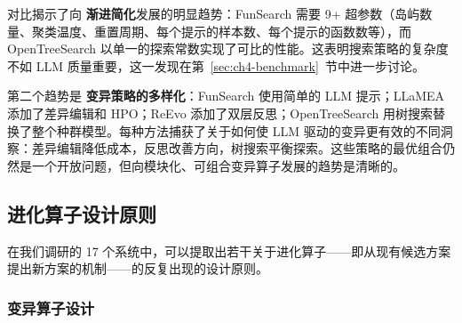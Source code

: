 \begin{table}[htbp]
\centering
{}
\caption{开源进化代码系统。呈现明显的渐进简化趋势：从 FunSearch 的 9+ 超参数到 OpenTreeSearch 的单一参数。}
\label{tab:opensource-compare}
\end{table}

对比揭示了向 \textbf{渐进简化}发展的明显趋势：FunSearch 需要 9+ 超参数（岛屿数量、聚类温度、重置周期、每个提示的样本数、每个提示的函数数等），而 OpenTreeSearch 以单一的探索常数实现了可比的性能。这表明搜索策略的复杂度不如 LLM 质量重要，这一发现在第~\ref{sec:ch4-benchmark}~节中进一步讨论。

第二个趋势是 \textbf{变异策略的多样化}：FunSearch 使用简单的 LLM 提示；LLaMEA 添加了差异编辑和 HPO；ReEvo 添加了双层反思；OpenTreeSearch 用树搜索替换了整个种群模型。每种方法捕获了关于如何使 LLM 驱动的变异更有效的不同洞察：差异编辑降低成本，反思改善方向，树搜索平衡探索。这些策略的最优组合仍然是一个开放问题，但向模块化、可组合变异算子发展的趋势是清晰的。


\subsection{进化算子设计原则}
\label{sec:ch4-operator-design}

在我们调研的 17 个系统中，可以提取出若干关于进化算子——即从现有候选方案提出新方案的机制——的反复出现的设计原则。

\subsubsection{变异算子设计}

